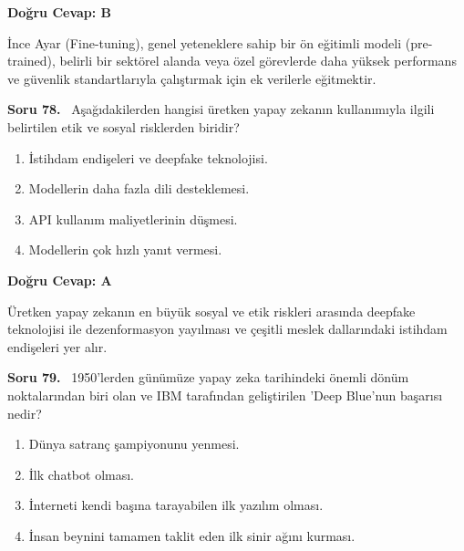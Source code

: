 \documentclass[11pt,a4paper,openany]{book}
\begin{document}
\vspace{4pt}
\begin{tcolorbox}[title=Cevap ve Açıklama, colback=gray!3!white, colframe=primarycolor!90!black, arc=2mm, fonttitle=\bfseries\sffamily, top=6pt, bottom=6pt]
    \textbf{Doğru Cevap: B}

    \vspace{2pt}
    İnce Ayar (Fine-tuning), genel yeteneklere sahip bir ön eğitimli modeli (pre-trained), belirli bir sektörel alanda veya özel görevlerde daha yüksek performans ve güvenlik standartlarıyla çalıştırmak için ek verilerle eğitmektir.
\end{tcolorbox}
\vspace{10pt}
\needspace{5cm}
\vspace{8pt}
\noindent\textbf{\large\sffamily Soru 78.} \ Aşağıdakilerden hangisi üretken yapay zekanın kullanımıyla ilgili belirtilen etik ve sosyal risklerden biridir?

\begin{enumerate}[label=\Alph*), leftmargin=25pt, topsep=4pt, itemsep=2pt]
        \item İstihdam endişeleri ve deepfake teknolojisi.
        \item Modellerin daha fazla dili desteklemesi.
        \item API kullanım maliyetlerinin düşmesi.
        \item Modellerin çok hızlı yanıt vermesi.
\end{enumerate}

\vspace{4pt}
\begin{tcolorbox}[title=Cevap ve Açıklama, colback=gray!3!white, colframe=primarycolor!90!black, arc=2mm, fonttitle=\bfseries\sffamily, top=6pt, bottom=6pt]
    \textbf{Doğru Cevap: A}

    \vspace{2pt}
    Üretken yapay zekanın en büyük sosyal ve etik riskleri arasında deepfake teknolojisi ile dezenformasyon yayılması ve çeşitli meslek dallarındaki istihdam endişeleri yer alır.
\end{tcolorbox}
\vspace{10pt}
\needspace{5cm}
\vspace{8pt}
\noindent\textbf{\large\sffamily Soru 79.} \ 1950'lerden günümüze yapay zeka tarihindeki önemli dönüm noktalarından biri olan ve IBM tarafından geliştirilen 'Deep Blue'nun başarısı nedir?

\begin{enumerate}[label=\Alph*), leftmargin=25pt, topsep=4pt, itemsep=2pt]
        \item Dünya satranç şampiyonunu yenmesi.
        \item İlk chatbot olması.
        \item İnterneti kendi başına tarayabilen ilk yazılım olması.
        \item İnsan beynini tamamen taklit eden ilk sinir ağını kurması.
\end{enumerate}
\end{document}
